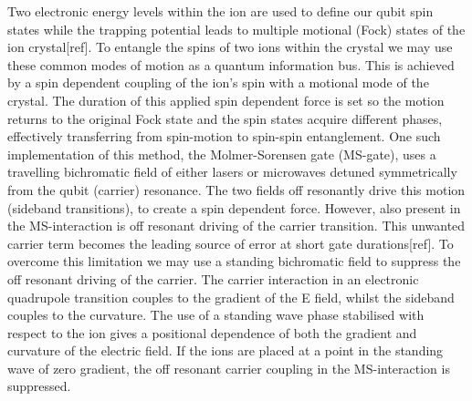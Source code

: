 \documentclass[12pt]{iopart}
\begin{document}
Two electronic energy levels within the ion are used to define our
qubit spin states while the trapping potential leads to multiple
motional (Fock) states of the ion crystal[ref]. To entangle the
spins of two ions within the crystal we may use these common modes
of motion as a quantum information bus. This is achieved by a spin
dependent coupling of the ion's spin with a motional mode of the
crystal.
The duration of this applied spin dependent force is set so the
motion returns to the original Fock state and the spin states
acquire different phases, effectively transferring from
spin-motion to spin-spin entanglement. One such implementation of
this method, the Molmer-Sorensen gate (MS-gate), uses a
travelling bichromatic field of either lasers or microwaves
detuned symmetrically from the qubit (carrier) resonance.
The two fields off resonantly drive this motion (sideband
transitions), to create a spin dependent force. However, also
present in the MS-interaction is off resonant driving of the
carrier transition. This unwanted carrier term becomes the
leading source of error at short gate durations[ref]. To overcome
this limitation we may use a standing bichromatic field to
suppress the off resonant driving of the carrier. The carrier
interaction in an electronic quadrupole transition couples to the
gradient of the E field, whilst the sideband couples to the
curvature. The use of a standing wave phase stabilised with
respect to the ion gives a positional dependence of both the
gradient and curvature of the electric field. If the ions are
placed at a point in the standing wave of zero gradient, the off
resonant carrier coupling in the MS-interaction is suppressed.
\end{document}
